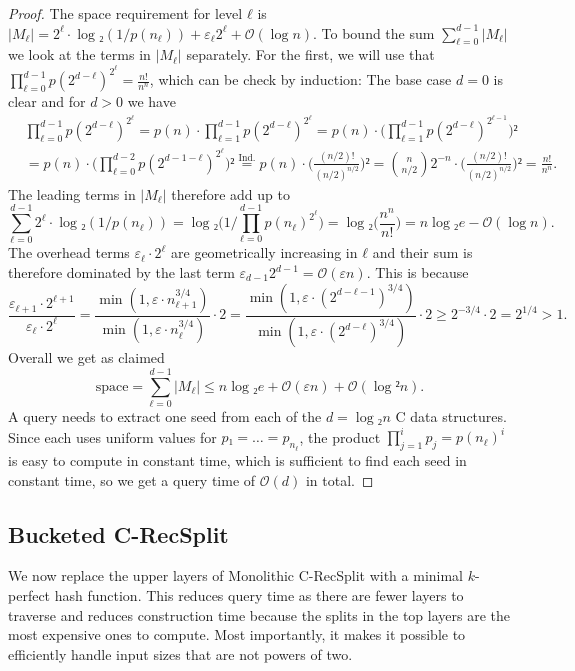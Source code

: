\documentclass[cleveref,thm-restate]{lipics-v2021}
\def\consensus{\texorpdfstring{C\scalebox{0.8}{ONSENSUS}}{CONSENSUS}\xspace}
\def\textrel#1#2{\stackrel{\text{#1}}{#2}}
\begin{document}
\begin{proof}
    The space requirement for level $ℓ$ is $|M_ℓ| = 2^{ℓ}·\log₂(1/p(n_ℓ)) + ε_ℓ 2^{ℓ} + 𝒪(\log n)$. To bound the sum $\sum_{ℓ = 0}^{d-1} |M_ℓ|$ we look at the terms in $|M_ℓ|$ separately. For the first, we will use that $\prod_{ℓ = 0}^{d-1} p(2^{d-ℓ})^{2^ℓ} = \frac{n!}{n^n}$, which can be check by induction: The base case $d = 0$ is clear and for $d > 0$ we have
    \begin{align*}
        &\prod_{ℓ = 0}^{d-1} p(2^{d-ℓ})^{2^ℓ}
        = p(n)·\prod_{ℓ = 1}^{d-1} p(2^{d-ℓ})^{2^ℓ}
        = p(n)·\Big(\prod_{ℓ = 1}^{d-1} p(2^{d-ℓ})^{2^{ℓ-1}}\Big)²\\
        &= p(n)·\Big(\prod_{ℓ = 0}^{d-2} p(2^{d-1-ℓ})^{2^{ℓ}}\Big)²
        \textrel{Ind.}{=} p(n) · \Big(\frac{(n/2)!}{(n/2)^{n/2}}\Big)²
        = \binom{n}{n/2} 2^{-n} · \Big(\frac{(n/2)!}{(n/2)^{n/2}}\Big)² = \frac{n!}{n^n}.
    \end{align*}
    The leading terms in $|M_ℓ|$ therefore add up to
    \[
        \sum_{ℓ = 0}^{d-1} 2^{ℓ}·\log₂(1/p(n_ℓ))
        = 
        \log₂\Big(1/\prod_{ℓ = 0}^{d-1} p(n_ℓ)^{2^{ℓ}}\Big) = \log₂\big(\frac{n^n}{n!}\big) = n \log₂ e - 𝒪(\log n).
    \]
    The overhead terms $ε_ℓ · 2^{ℓ}$ are geometrically increasing in $ℓ$ and their sum is therefore dominated by the last term $ε_{d-1}2^{d-1} = 𝒪(εn)$. This is because
    \[ \frac{ε_{ℓ+1}·2^{ℓ+1}}{ε_ℓ · 2^{ℓ}} = \frac{\min(1,ε·n_{ℓ+1}^{3/4})}{\min(1,ε·n_ℓ^{3/4})}·2 = \frac{\min(1,ε·(2^{d-ℓ-1})^{3/4})}{\min(1,ε·(2^{d-ℓ})^{3/4})}·2 ≥ 2^{-3/4}·2 = 2^{1/4} > 1. \]
    Overall we get as claimed
    \[ \textrm{space} = \sum_{ℓ = 0}^{d-1} |M_ℓ| ≤ n\log₂ e + 𝒪(εn) + 𝒪(\log² n).\]
    A query needs to extract one seed from each of the $d = \log₂ n$ \consensus data structures. Since each uses uniform values for $p₁ = … = p_{n_ℓ}$, the product $\prod_{j = 1}^{i} p_j = p(n_ℓ)^i$ is easy to compute in constant time, which is sufficient to find each seed in constant time, so we get a query time of $𝒪(d)$ in total.
\end{proof}

\subsection{Bucketed \consensus-RecSplit}
\label{sec:bucketed_consensus_recsplit}
We now replace the upper layers of Monolithic \consensus-RecSplit with a minimal $k$-perfect hash function.
This reduces query time as there are fewer layers to traverse and reduces construction time because the splits in the top layers are the most expensive ones to compute.
Most importantly, it makes it possible to efficiently handle input sizes that are not powers of two.
\end{document}
